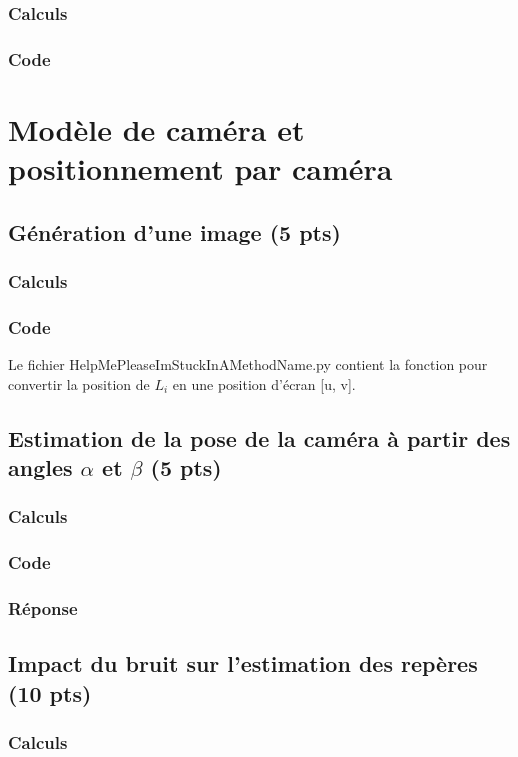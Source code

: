 \documentclass[12pt]{article}
\begin{document}
\subsubsection{Calculs}

\subsubsection{Code}

\newpage
\section{Modèle de caméra et positionnement par caméra}

\subsection{Génération d'une image (5 pts)}
\subsubsection{Calculs}
\subsubsection{Code}
Le fichier HelpMePleaseImStuckInAMethodName.py contient la fonction pour convertir la position de $L_i$ en une position d'écran [u, v].

\subsection{Estimation de la pose de la caméra à partir des angles $\alpha$ et $\beta$ (5 pts)}
\subsubsection{Calculs}
\subsubsection{Code}
\subsubsection{Réponse}

\subsection{Impact du bruit sur l'estimation des repères (10 pts)}
\subsubsection{Calculs}
\end{document}
